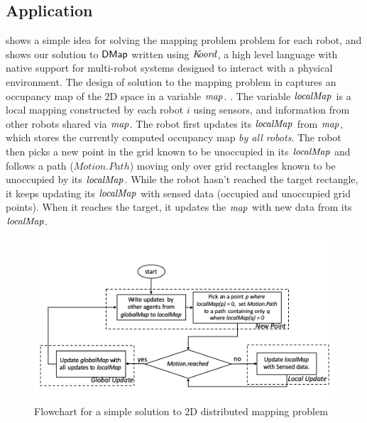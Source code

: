 \subsection{\dmap Application}

 shows a simple idea for solving the mapping problem problem for each robot, and  shows our solution to ${\sf DMap}$ written using $\emph{K\kern-2pt oord}$, a high level language with native support for multi-robot systems designed to interact with a physical environment. The design of solution to the mapping problem in  captures an occupancy map of the 2D space in a variable $\mathit{map}$. . The variable $\mathit{localMap}$ is a local mapping constructed by each robot $i$ using sensors, and information from other robots shared via $\mathit{map}$. The robot first updates its $\mathit{localMap}$ from $\mathit{map}$, which stores the currently computed occupancy map \emph{by all robots}.  The robot then picks a new point in the grid known to be unoccupied in its $\mathit{localMap}$ and follows a path ($\mathit{Motion.Path}$) moving only over grid rectangles known to be unoccupied by its $\mathit{localMap}$. While the robot hasn't reached the target rectangle, it keeps updating its $\mathit{localMap}$ with sensed data (occupied and unoccupied grid points). When it reaches the target, it updates the $\mathit{map}$ with new data from its $\mathit{localMap}$.


\begin{figure}[!htbp]
    \centering
    \includegraphics[width=\linewidth]{figs/map_flowchart.png}
    \caption{Flowchart for a simple solution to 2D distributed mapping problem\vspace{-2mm}}
    \label{fig:flowmap1}
\end{figure}

